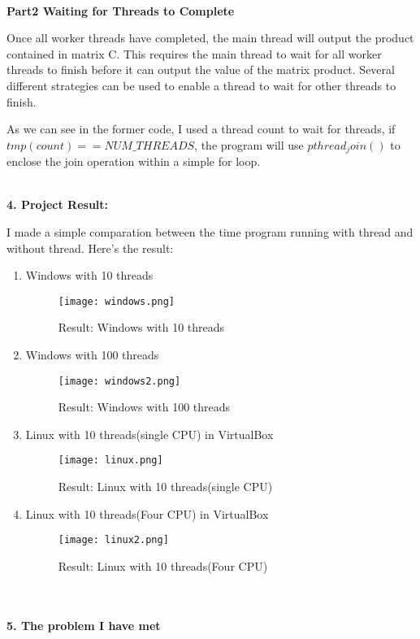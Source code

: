 \documentclass[12pt,a4paper]{article}
\begin{document}
~\\
\textbf{Part2 Waiting for Threads to Complete}

Once all worker threads have completed, the main thread will output the product contained in matrix C. This requires the main thread to wait for all worker threads to finish before it can output the value of the matrix product. Several different strategies can be used to enable a thread to wait for other threads to finish. 

As we can see in the former code, I used a thread count to wait for threads, if $tmp(count)==NUM\_THREADS$, the program will use $pthread_join()$ to enclose the join operation within a simple for loop.
~\\
~\\
\begin{large}
\textbf{4. Project Result:}
\end{large}
I made a simple comparation between the time program running with thread and without thread. Here's the result: 
\begin{enumerate}

\item Windows with 10 threads
\begin{figure}[H]
  \centering
  \texttt{[image: windows.png]}
  \caption{Result: Windows with 10 threads}%
\end{figure}
\item Windows with 100 threads
\begin{figure}[H]
  \centering
  \texttt{[image: windows2.png]}
  \caption{Result: Windows with 100 threads}%
\end{figure}
\item  Linux with 10 threads(single CPU) in VirtualBox
\begin{figure}[H]
  \centering
  \texttt{[image: linux.png]}
  \caption{Result: Linux with 10 threads(single CPU)}%
\end{figure}
\item Linux with 10 threads(Four CPU) in VirtualBox
\begin{figure}[H]
  \centering
  \texttt{[image: linux2.png]}
  \caption{Result: Linux with 10 threads(Four CPU)}%
\end{figure}


\end{enumerate}

\begin{large}
~\\
~\\
\textbf{5. The problem I have met}
\end{large}
\end{document}
